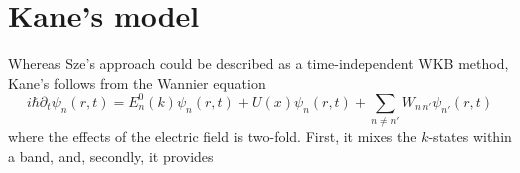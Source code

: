\section{Kane's model}
Whereas Sze's approach could be described as a time-independent WKB method, Kane's follows from the Wannier equation
$$i\hbar\partial_t\psi_n(r,t)=E_n^0(k)\psi_n(r,t)+U(x)\psi_n(r,t)+\sum_{n\neq n'} W_{n\,n'}\psi_{n'}(r,t)$$
where the effects of the electric field is two-fold.  First, it mixes the $k$-states within a band, and, secondly, it provides 